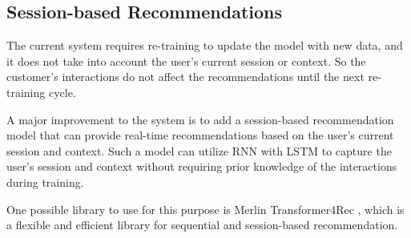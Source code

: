 \subsection{Session-based Recommendations}

The current system requires re-training to update the model with new data, and it does not take into account the user's current session or context.
So the customer's interactions do not affect the recommendations until the next re-training cycle.

A major improvement to the system is to add a session-based recommendation model that can provide real-time recommendations based on the user's current session and context.
Such a model can utilize RNN with LSTM to capture the user's session and context without requiring prior knowledge of the interactions during training. 

One possible library to use for this purpose is Merlin Transformer4Rec \cite{NvidiaMerlinTransformers4Rec}, 
which is a flexible and efficient library for sequential and session-based recommendation.\cite{NvidiaMerlinTransformers4Rec}

